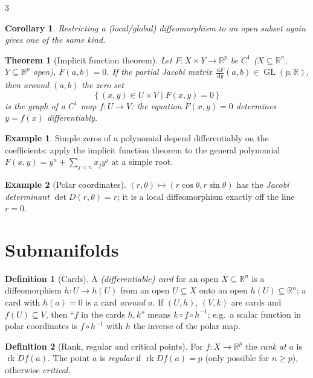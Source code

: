 \documentclass[10pt,a4paper,landscape]{article}
\theoremstyle{definition}
\newtheorem{defn}{Definition}[section]
\newtheorem{exm}{Example}[section]
\theoremstyle{plain}
\newtheorem{thm}{Theorem}[section]
\newtheorem{cor}{Corollary}[section]
\theoremstyle{remark}
\newcommand{\R}{\mathbb{R}}
\newcommand{\dd}{\,\mathrm{d}}
\newcommand{\set}[1]{\left\{ #1 \right\}}
\newcommand{\comp}{\circ}
\DeclareMathOperator{\rk}{rk}
\DeclareMathOperator{\GL}{GL}
\begin{document}
\begin{multicols*}{3}
\begin{cor}
Restricting a (local/global) diffeomorphism to an open subset again gives one of the same kind.
\end{cor}

\begin{thm}[Implicit function theorem]
Let $F: X \times Y \to \R^p$ be $C^1$ ($X \subseteq \R^n$, $Y \subseteq \R^p$ open), $F(a,b) = 0$. If the partial Jacobi matrix $\frac{\dd F}{\dd y}(a,b) \in \GL(p,\R)$, then around $(a,b)$ the zero set
\[
\set{(x,y) \in U \times V \mid F(x,y) = 0}
\]
is the graph of a $C^1$ map $f: U \to V$: the equation $F(x,y) = 0$ determines $y = f(x)$ differentiably.
\end{thm}

\begin{exm}
Simple zeros of a polynomial depend differentiably on the coefficients: apply the implicit function theorem to the general polynomial $F(x, y) = y^n + \sum_{j<n} x_j y^j$ at a simple root.
\end{exm}

\begin{exm}[Polar coordinates]
$(r,\theta) \mapsto (r\cos\theta, r\sin\theta)$ has the \emph{Jacobi determinant} $\det D(r,\theta) = r$; it is a local diffeomorphism exactly off the line $r = 0$.
\end{exm}

\section{Submanifolds}

\begin{defn}[Cards]
A \emph{(differentiable) card} for an open $X \subseteq \R^n$ is a diffeomorphism $h: U \to h(U)$ from an open $U \subseteq X$ onto an open $h(U) \subseteq \R^n$; a card with $h(a) = 0$ is a card \emph{around} $a$. If $(U,h)$, $(V,k)$ are cards and $f(U) \subseteq V$, then ``$f$ in the cards $h,k$'' means $k \comp f \comp h^{-1}$; e.g.\ a scalar function in polar coordinates is $f \comp h^{-1}$ with $h$ the inverse of the polar map.
\end{defn}

\begin{defn}[Rank, regular and critical points]
For $f: X \to \R^p$ the \emph{rank at} $a$ is $\rk Df(a)$. The point $a$ is \emph{regular} if $\rk Df(a) = p$ (only possible for $n \ge p$), otherwise \emph{critical}.
\end{defn}


\end{multicols*}
\end{document}
